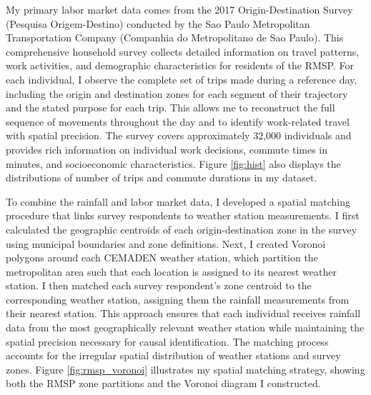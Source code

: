 My primary labor market data comes from the 2017 Origin-Destination Survey (Pesquisa Origem-Destino) conducted by the Sao Paulo Metropolitan Transportation Company (Companhia do Metropolitano de Sao Paulo). This comprehensive household survey collects detailed information on travel patterns, work activities, and demographic characteristics for residents of the RMSP. For each individual, I observe the complete set of trips made during a reference day, including the origin and destination zones for each segment of their trajectory and the stated purpose for each trip. This allows me to reconstruct the full sequence of movements throughout the day and to identify work-related travel with spatial precision. The survey covers approximately 32,000 individuals and provides rich information on individual work decisions, commute times in minutes, and socioeconomic characteristics. Figure \ref{fig:hist} also displays the distributions of number of trips and commute durations in my dataset.

To combine the rainfall and labor market data, I developed a spatial matching procedure that links survey respondents to weather station measurements. I first calculated the geographic centroids of each origin-destination zone in the survey using municipal boundaries and zone definitions. Next, I created Voronoi polygons around each CEMADEN weather station, which partition the metropolitan area such that each location is assigned to its nearest weather station. I then matched each survey respondent's zone centroid to the corresponding weather station, assigning them the rainfall measurements from their nearest station. This approach ensures that each individual receives rainfall data from the most geographically relevant weather station while maintaining the spatial precision necessary for causal identification. The matching process accounts for the irregular spatial distribution of weather stations and survey zones. Figure \ref{fig:rmsp_voronoi} illustrates my spatial matching strategy, showing both the RMSP zone partitions and the Voronoi diagram I constructed.

